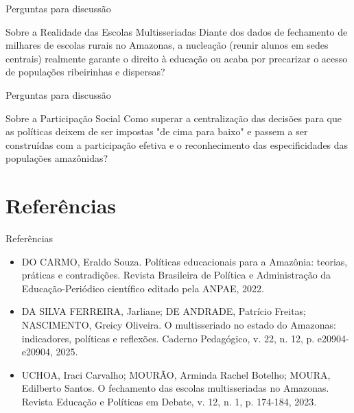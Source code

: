 \documentclass[12pt]{beamer}
\begin{document}
		\begin{frame}{Perguntas para discussão}
			\begin{block}{Sobre a Realidade das Escolas Multisseriadas}
				\justifying
				Diante dos dados de fechamento de milhares de escolas rurais no Amazonas, a nucleação (reunir alunos em sedes centrais) realmente garante o direito à educação ou acaba por precarizar o acesso de populações ribeirinhas e dispersas?
			\end{block}
		\end{frame}
		
		\begin{frame}{Perguntas para discussão}
			\begin{block}{Sobre a Participação Social}
				\justifying
				Como superar a centralização das decisões para que as políticas deixem de ser impostas "de cima para baixo" e passem a ser construídas com a participação efetiva e o reconhecimento das especificidades das populações amazônidas?
			\end{block}
		\end{frame}
		
		
	\section{Referências}
	
		\begin{frame}{Referências}
			\begin{itemize}
				\small
				\item DO CARMO, Eraldo Souza. Políticas educacionais para a Amazônia: teorias, práticas e contradições. Revista Brasileira de Política e Administração da Educação-Periódico científico editado pela ANPAE, 2022.
				
				\item DA SILVA FERREIRA, Jarliane; DE ANDRADE, Patrício Freitas; NASCIMENTO, Greicy Oliveira. O multisseriado no estado do Amazonas: indicadores, políticas e reflexões. Caderno Pedagógico, v. 22, n. 12, p. e20904-e20904, 2025.
				
				\item UCHOA, Iraci Carvalho; MOURÃO, Arminda Rachel Botelho; MOURA, Edilberto Santos. O fechamento das escolas multisseriadas no Amazonas. Revista Educação e Políticas em Debate, v. 12, n. 1, p. 174-184, 2023.
			\end{itemize}
		\end{frame}
		


	
	
	
	
\end{document}

